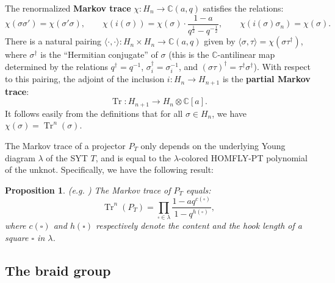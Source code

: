 \documentclass[12pt]{amsart}
\numberwithin{equation}{section}
\newtheorem{proposition}[theorem]{Proposition}
\theoremstyle{definition}
\theoremstyle{remark}
\DeclareMathOperator{\Tr}{Tr}
\newcommand{\CC}{\mathbb{C}}
\renewcommand{\1}{\mathbf{1}}
\newcommand{\sq}{\square}
\begin{document}
The renormalized \textbf{Markov trace} \(\chi: H_n \to \CC(a,q)\) satisfies  the relations:
\begin{equation}
\chi(\sigma \sigma ') = \chi(\sigma'  \sigma), \qquad
\chi(i(\sigma)) = \chi(\sigma) \cdot \frac{1-a}{q^{\frac 12}-q^{-\frac 12}}, \qquad
\chi(i(\sigma) \sigma_n) = \chi(\sigma).
\end{equation}
There is a natural  pairing \(\langle  \cdot, \cdot \rangle:  H_n \times H_n \to \CC(a,q)\)
 given by \(\langle \sigma, \tau \rangle = \chi(\sigma \tau ^\dagger)\), where \( \sigma^\dagger\) is the ``Hermitian conjugate'' of \(\sigma\) (this is the \(\CC\)-antilinear map   determined by the relations \(q^\dagger = q^{-1}\),  \(\sigma_i^\dagger = \sigma _i^{-1}\), and \((\sigma \tau )^\dagger = \tau^\dagger \sigma ^\dagger\)). With respect to this pairing, the adjoint of the  inclusion \(i: H_n \to H_{n+1}\) is the \textbf{partial Markov trace}:
$$
\Tr : H_{n+1} \to H_n \otimes \CC[a].
$$
It follows easily from the definitions that for all \(\sigma \in H_n\), we have \(\chi(\sigma) = \Tr^n(\sigma).\)

 The Markov trace of a projector $P_T$ only depends on the underlying Young diagram $\lambda$ of the SYT $T$, and is equal to the $\lambda$-colored HOMFLY-PT polynomial of the unknot. Specifically, we have the following result: %

\begin{proposition}(e.g. \cite{Ai}) The Markov trace of $P_T$ equals:
$$
\Tr ^n(P_T)=\prod_{\sq\in \lambda}\frac{1-aq^{c(\sq)}}{1-q^{h(\sq)}},
$$
where $c(\sq)$ and $h(\sq)$ respectively denote the content and the hook length of a square $\sq$ in $\lambda$.
\end{proposition}

\subsection{The braid group}
\end{document}
